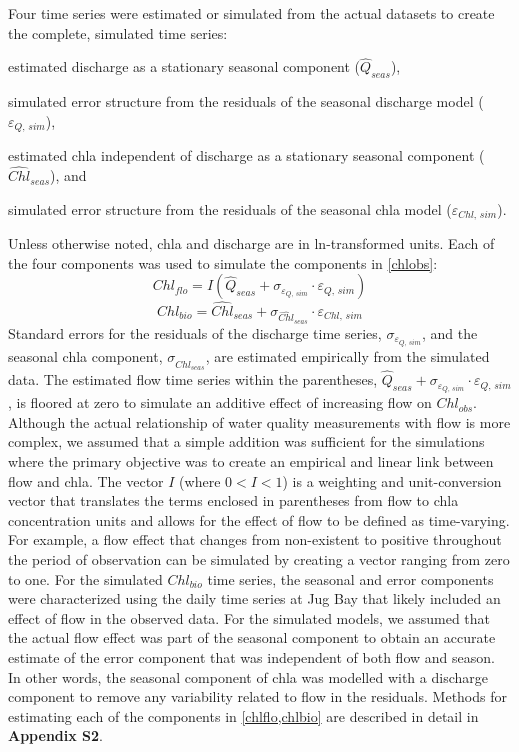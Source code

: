 \documentclass{svjour3}\usepackage[]{graphicx}\usepackage[]{color}
\begin{document}
Four time series were estimated or simulated from the actual datasets to create the complete, simulated time series:\begin{inparaenum}[1\upshape)]
\item estimated discharge as a stationary seasonal component ($\widehat{Q}_{seas}$),
\item simulated error structure from the residuals of the seasonal discharge model ($\varepsilon_{Q,\,sim}$), 
\item estimated \ac{chla} independent of discharge as a stationary seasonal component ($\widehat{Chl}_{seas}$), and
\item simulated error structure from the residuals of the seasonal \ac{chla} model ($\varepsilon_{Chl,\,sim}$).
\end{inparaenum}
Unless otherwise noted, \ac{chla} and discharge are in ln-transformed units.  Each of the four components was used to simulate the components in \cref{chlobs}:
\begin{equation} \label{chlflo}
Chl_{flo} = I\left(\widehat{Q}_{seas} + \sigma_{\varepsilon_{Q,\,sim}}\cdot\varepsilon_{Q,\,sim}\right)
\end{equation}
\begin{equation} \label{chlbio}
Chl_{bio} = \widehat{Chl}_{seas} + \sigma_{\widehat{Chl}_{seas}}\cdot\varepsilon_{Chl,\,sim}
\end{equation}
Standard errors for the residuals of the discharge time series, $\sigma_{\varepsilon_{Q,\,sim}}$, and the seasonal \ac{chla} component, $\sigma_{\widehat{Chl}_{seas}}$, are estimated empirically from the simulated data.  The estimated flow time series within the parentheses, $\widehat{Q}_{seas} + \sigma_{\varepsilon_{Q,\,sim}}\cdot\varepsilon_{Q,\,sim}$, is floored at zero to simulate an additive effect of increasing flow on $Chl_{obs}$.  Although the actual relationship of water quality measurements with flow is more complex, we assumed that a simple addition was sufficient for the simulations where the primary objective was to create an empirical and linear link between flow and \ac{chla}. The vector $I$  (where $0 < I < 1$) is a weighting and unit-conversion vector that translates the terms enclosed in parentheses from flow to \ac{chla} concentration units and allows for the effect of flow to be defined as time-varying. For example, a flow effect that changes from non-existent to positive throughout the period of observation can be simulated by creating a vector ranging from zero to one. For the simulated $Chl_{bio}$ time series, the seasonal and error components were characterized using the daily time series at Jug Bay that likely included an effect of flow in the observed data.  For the simulated models, we assumed that the actual flow effect was part of the seasonal component to obtain an accurate estimate of the error component that was independent of both flow and season.  In other words, the seasonal component of \ac{chla} was modelled with a discharge component to remove any variability related to flow in the residuals. Methods for estimating each of the components in \cref{chlflo,chlbio} are described in detail in {\bf Appendix S2}.
\end{document}
